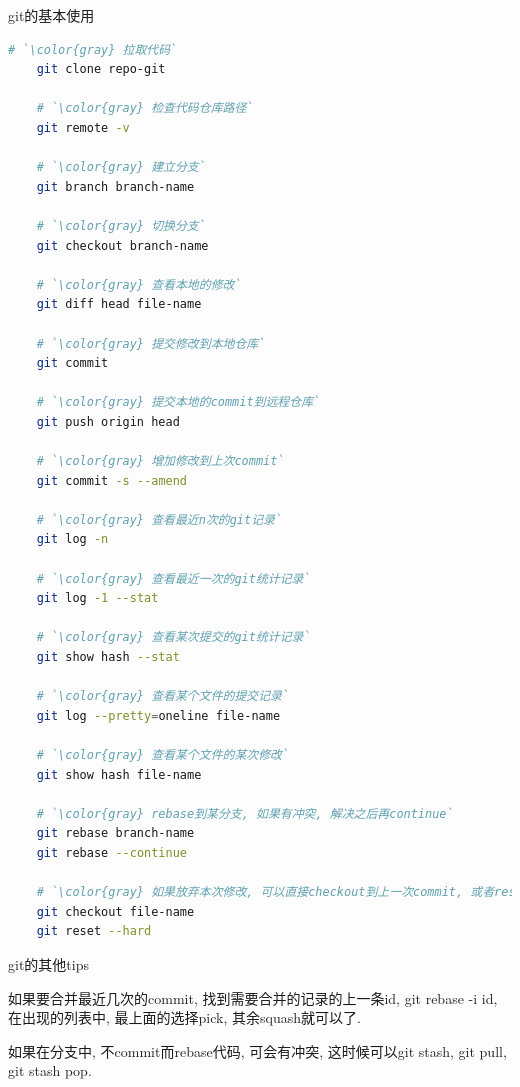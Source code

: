 {\ZHH git的基本使用}\par
\begin{lstlisting}[language=bash]
    # `\color{gray} 拉取代码`
    git clone repo-git

    # `\color{gray} 检查代码仓库路径`
    git remote -v

    # `\color{gray} 建立分支`
    git branch branch-name

    # `\color{gray} 切换分支`
    git checkout branch-name

    # `\color{gray} 查看本地的修改`
    git diff head file-name

    # `\color{gray} 提交修改到本地仓库`
    git commit

    # `\color{gray} 提交本地的commit到远程仓库`
    git push origin head

    # `\color{gray} 增加修改到上次commit`
    git commit -s --amend

    # `\color{gray} 查看最近n次的git记录`
    git log -n

    # `\color{gray} 查看最近一次的git统计记录`
    git log -1 --stat

    # `\color{gray} 查看某次提交的git统计记录`
    git show hash --stat

    # `\color{gray} 查看某个文件的提交记录`
    git log --pretty=oneline file-name

    # `\color{gray} 查看某个文件的某次修改`
    git show hash file-name

    # `\color{gray} rebase到某分支, 如果有冲突, 解决之后再continue`
    git rebase branch-name
    git rebase --continue

    # `\color{gray} 如果放弃本次修改, 可以直接checkout到上一次commit, 或者reset`
    git checkout file-name
    git reset --hard
\end{lstlisting}
\vspace{10pt}


{\ZHH git的其他tips}\par
{如果要合并最近几次的commit, 找到需要合并的记录的上一条id, git rebase -i id, 在出现的列表中, 最上面的选择pick, 其余squash就可以了. }\par
{如果在分支中, 不commit而rebase代码, 可会有冲突, 这时候可以git stash, git pull, git stash pop. }



